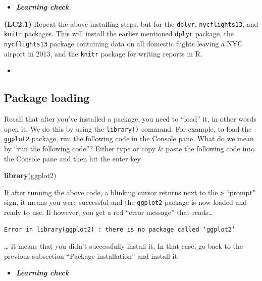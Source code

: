 \documentclass[12pt, krantz2,]{krantz}
\makeatletter
\newenvironment{Shaded}{\begin{snugshade}}{\end{snugshade}}
\newcommand{\KeywordTok}[1]{\textcolor[rgb]{0.27,0.27,0.27}{\textbf{#1}}}
\newcommand{\NormalTok}[1]{#1}
\newenvironment{kframe}{%
\medskip{}
\setlength{\fboxsep}{.8em}
 \def\at@end@of@kframe{}%
 \ifinner\ifhmode%
  \def\at@end@of@kframe{\end{minipage}}%
  \begin{minipage}{\columnwidth}%
 \fi\fi%
 \def\FrameCommand##1{\hskip\@totalleftmargin \hskip-\fboxsep
 \colorbox{shadecolor}{##1}\hskip-\fboxsep
     \hskip-\linewidth \hskip-\@totalleftmargin \hskip\columnwidth}%
 \MakeFramed {\advance\hsize-\width
   \@totalleftmargin\z@ \linewidth\hsize
   \@setminipage}}%
 {\par\unskip\endMakeFramed%
 \at@end@of@kframe}
\renewenvironment{Shaded}{\begin{kframe}}{\end{kframe}}
\newenvironment{rmdblock}[1]
  {\begin{shaded*}
  \begin{itemize}
  \renewcommand{\labelitemi}{
    \raisebox{-.7\height}[0pt][0pt]{
    }
  }
  \item
  }
  {
  \end{itemize}
  \end{shaded*}
  }
\newenvironment{learncheck}
  {\begin{rmdblock}{warning}}
  {\end{rmdblock}}
\makeatother
\begin{document}
\begin{learncheck}
\textbf{\emph{Learning check}}
\end{learncheck}

\textbf{(LC2.1)} Repeat the above installing steps, but for the \texttt{dplyr}, \texttt{nycflights13}, and \texttt{knitr} packages. This will install the earlier mentioned \texttt{dplyr} package, the \texttt{nycflights13} package containing data on all domestic flights leaving a NYC airport in 2013, and the \texttt{knitr} package for writing reports in R.

\begin{learncheck}

\end{learncheck}

\hypertarget{package-loading}{%
\subsection{Package loading}\label{package-loading}}

Recall that after you've installed a package, you need to ``load'' it, in other words open it. We do this by using the \texttt{library()} command. For example, to load the \texttt{ggplot2} package, run the following code in the Console pane. What do we mean by ``run the following code''? Either type or copy \& paste the following code into the Console pane and then hit the enter key.

\begin{Shaded}
\begin{Highlighting}[]
\KeywordTok{library}\NormalTok{(ggplot2)}
\end{Highlighting}
\end{Shaded}

If after running the above code, a blinking cursor returns next to the \texttt{\textgreater{}} ``prompt'' sign, it means you were successful and the \texttt{ggplot2} package is now loaded and ready to use. If however, you get a red ``error message'' that reads\ldots{}

\begin{verbatim}
Error in library(ggplot2) : there is no package called ‘ggplot2’
\end{verbatim}

\ldots{} it means that you didn't successfully install it. In that case, go back to the previous subsection ``Package installation'' and install it.

\begin{learncheck}
\textbf{\emph{Learning check}}
\end{learncheck}
\end{document}
